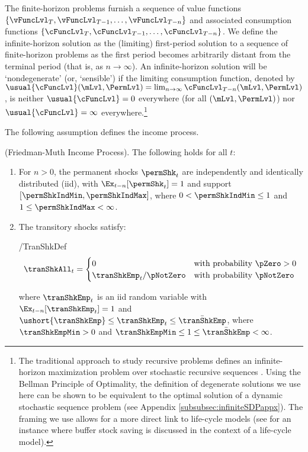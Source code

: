 \documentclass[BufferStockTheory]{subfiles}
\begin{document}
The finite-horizon problems furnish a sequence of value functions $\{\vFuncLvl_{T},\vFuncLvl_{T-1},\ldots,\vFuncLvl_{T-n}\}$ and associated consumption functions $\{\cFuncLvl_{T},\cFuncLvl_{T-1},\ldots,\cFuncLvl_{T-n}\}$. We define the infinite-horizon solution as the (limiting) first-period solution to a sequence of finite-horizon problems as the first period becomes arbitrarily distant from the terminal period (that is, as $n \rightarrow \infty$). An infinite-horizon solution will be `nondegenerate' (or, `sensible') if the limiting consumption function, denoted by $\usual{\cFuncLvl}(\mLvl,\PermLvl) = \lim_{n \rightarrow \infty} \cFuncLvl_{T-n}(\mLvl,\PermLvl)$, is neither $\usual{\cFuncLvl}=0$ everywhere (for all $(\mLvl,\PermLvl)$) nor $\usual{\cFuncLvl}=\infty$ everywhere.\footnote{The traditional approach to study recursive problems defines an infinite-horizon maximization problem over stochastic recursive sequences \citep{sargstach2023}. Using the Bellman Principle of Optimality, the definition of degenerate solutions we use here can be shown to be equivalent to the optimal solution of a dynamic stochastic sequence problem (see Appendix \ref{subsubsec:infiniteSDPappx}). The framing we use allows for a more direct link to life-cycle models (see \cite{gpLifeCycle} for an instance where buffer stock saving is discussed in the context of a life-cycle model).} 

The following assumption defines the income process. 

\begin{assumI}\label{ass:shocks}(Friedman-Muth Income Process).
The following holds for all $t$:
\begin{enumerate}
\item For $n>0$, the permanent shocks ${\permShk}_{t}$ are independently and identically distributed (iid), with  $\Ex_{t-n}[{\permShk}_{t}]=1$ and support $[\permShkIndMin,\permShkIndMax]$, where $0 < \permShkIndMin \leq 1$ and $1 \leq \permShkIndMax < \infty$. 
\item The transitory shocks satisfy: 
\begin{verbatimwrite}{\EqDir/TranShkDef}
  \begin{equation}
    \tranShkAll_{t}=
    \begin{cases}
      0\phantom{_{t+1}/\pNotZero} & \text{with probability $\pZero > 0$} \\
      \tranShkEmp_{t}/\pNotZero      & \text{with probability $\pNotZero  $} %
    \end{cases} \label{eq:TranShkDef}
  \end{equation}
\end{verbatimwrite}

\noindent where $\tranShkEmp_{t}$ is an iid random variable with $\Ex_{t-n}[{\tranShkEmp}_{t}]=1$ and $\ushort{\tranShkEmp}\leq  \tranShkEmp_{t} \leq \bar{\tranShkEmp}$, where $\tranShkEmpMin >0$ and $\tranShkEmpMin \leq 1 \leq \bar{\tranShkEmp}<\infty$. 
\end{enumerate} 
\end{assumI}
\end{document}
